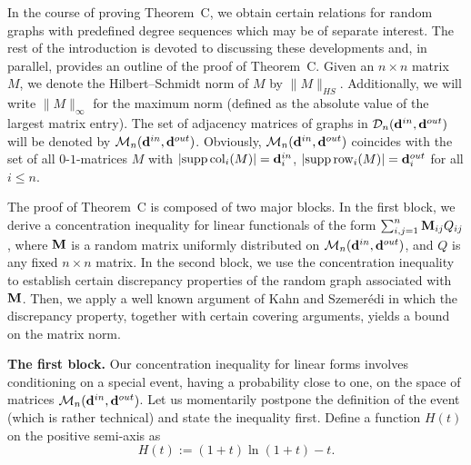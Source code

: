 \documentclass[12pt]{article}
\theoremstyle{definition}
\theoremstyle{plain}
\newcommand{\supp}{{\rm supp\,}}
\def\ranmtx{{\bf{}M}}
\def\InDeg{{\bf d}^{in}}
\def\OutDeg{{\bf d}^{out}}
\def\DGraphSet{{\mathcal D}_n}
\def\MatrixSet{{\mathcal M}_n}
\def\Col{{\rm col}}
\def\Row{{\rm row}}
\begin{document}
\bigskip

In the course of proving Theorem~C, we obtain certain relations for random graphs with predefined degree sequences
which may be of separate interest. The rest of the introduction is devoted to
discussing these developments and, in parallel, provides an outline of the proof of Theorem~C.
Given an $n\times n$ matrix $M$, we denote the Hilbert--Schmidt norm of $M$ by $\|M\|_{HS}$.
Additionally, we will write $\|M\|_\infty$ for the maximum norm (defined as the absolute value of the
largest matrix entry).
The set of adjacency matrices of graphs in $\DGraphSet(\InDeg, \OutDeg)$
will be denoted by $\MatrixSet(\InDeg, \OutDeg)$. Obviously, $\MatrixSet(\InDeg, \OutDeg)$
coincides with the set of all $0\text{-}1$-matrices $M$ with
$|\supp\Col_i(M)|=\InDeg_i$, $|\supp\Row_i(M)|=\OutDeg_i$ for all $i\leq n$.

The proof of Theorem~C is composed of two major blocks. In the first block,
we derive a concentration inequality for linear functionals of the form
$\sum_{i,j=1}^n \ranmtx_{ij}Q_{ij}$, where $\ranmtx$ is a random matrix uniformly
distributed on $\MatrixSet(\InDeg, \OutDeg)$, and $Q$ is any fixed $n\times n$ matrix.
In the second block,
we use the concentration inequality to establish certain discrepancy properties of the random graph
associated with $\ranmtx$. Then, we apply a well known argument of Kahn and Szemer\'edi \cite{FKS}
in which the discrepancy property, together with certain covering arguments,
yields a bound on the matrix norm.

{\bf The first block.} Our concentration inequality for linear forms involves conditioning on a special event, 
having a probability close to one, on the space of matrices $\MatrixSet(\InDeg, \OutDeg)$.
Let us momentarily postpone the definition of the event (which is rather technical) and state the inequality first.
Define a function $H(t)$ on the positive semi-axis as
\begin{equation}\label{eq: H definition}
H(t):=(1+t)\ln (1+t) -t.
\end{equation}
\end{document}
